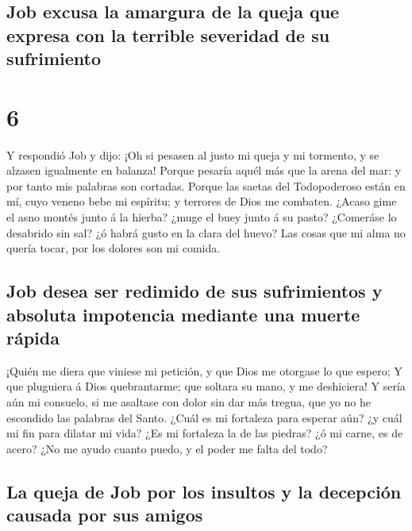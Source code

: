 \hypertarget{job-excusa-la-amargura-de-la-queja-que-expresa-con-la-terrible-severidad-de-su-sufrimiento}{%
\subsection{Job excusa la amargura de la queja que expresa con la
terrible severidad de su
sufrimiento}\label{job-excusa-la-amargura-de-la-queja-que-expresa-con-la-terrible-severidad-de-su-sufrimiento}}

\hypertarget{section-5}{%
\section{6}\label{section-5}}

 Y respondió Job y dijo:  ¡Oh si pesasen al
justo mi queja y mi tormento, y se alzasen igualmente en balanza!
 Porque pesaría aquél más que la arena del mar: y por
tanto mis palabras son cortadas.  Porque las saetas del
Todopoderoso están en mí, cuyo veneno bebe mi espíritu; y terrores de
Dios me combaten.  ¿Acaso gime el asno montés junto á la
hierba? ¿muge el buey junto á su pasto?  ¿Comeráse lo
desabrido sin sal? ¿ó habrá gusto en la clara del huevo? 
Las cosas que mi alma no quería tocar, por los dolores son mi comida.

\hypertarget{job-desea-ser-redimido-de-sus-sufrimientos-y-absoluta-impotencia-mediante-una-muerte-ruxe1pida}{%
\subsection{Job desea ser redimido de sus sufrimientos y absoluta
impotencia mediante una muerte
rápida}\label{job-desea-ser-redimido-de-sus-sufrimientos-y-absoluta-impotencia-mediante-una-muerte-ruxe1pida}}

 ¡Quién me diera que viniese mi petición, y que Dios me
otorgase lo que espero;  Y que pluguiera á Dios
quebrantarme; que soltara su mano, y me deshiciera!  Y
sería aún mi consuelo, si me asaltase con dolor sin dar más tregua, que
yo no he escondido las palabras del Santo.  ¿Cuál es mi
fortaleza para esperar aún? ¿y cuál mi fin para dilatar mi vida?
 ¿Es mi fortaleza la de las piedras? ¿ó mi carne, es de
acero?  ¿No me ayudo cuanto puedo, y el poder me falta
del todo?

\hypertarget{la-queja-de-job-por-los-insultos-y-la-decepciuxf3n-causada-por-sus-amigos}{%
\subsection{La queja de Job por los insultos y la decepción causada por
sus
amigos}\label{la-queja-de-job-por-los-insultos-y-la-decepciuxf3n-causada-por-sus-amigos}}

